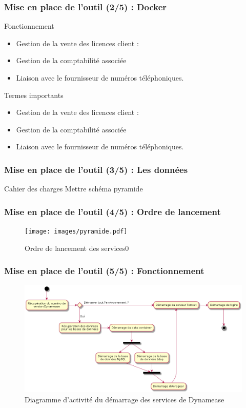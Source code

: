 \begin{frame}
	\frametitle{Mise en place de l'outil (2/5) : Docker}

    \begin{block}{Fonctionnement}
	 \begin{itemize}
	  \item Gestion de la vente des licences client :
      \item Gestion de la comptabilité associée
	  \item Liaison avec le fournisseur de numéros téléphoniques.
	 \end{itemize}
	\end{block}

	\begin{block}{Termes importants}
	 \begin{itemize}
	  \item Gestion de la vente des licences client :
      \item Gestion de la comptabilité associée
	  \item Liaison avec le fournisseur de numéros téléphoniques.
	 \end{itemize}
	\end{block}

\end{frame}

\begin{frame}
	\frametitle{Mise en place de l'outil (3/5) : Les données}

    \begin{block}{Cahier des charges}
		Mettre schéma pyramide
	\end{block}

\end{frame}

\begin{frame}
	\frametitle{Mise en place de l'outil (4/5) : Ordre de lancement}

    \begin{center}
	  \begin{figure}
        \texttt{[image: images/pyramide.pdf]}
	   \caption{Ordre de lancement des services0}
	  \end{figure}
	\end{center}
\end{frame}


\begin{frame}
	\frametitle{Mise en place de l'outil (5/5) : Fonctionnement}

    \begin{center}
	  \begin{figure}
        \includegraphics[scale=0.30]{images/activity_outil.png}
	   \caption{Diagramme d'activité du démarrage des services de Dynamease}
	  \end{figure}
	\end{center}

\end{frame}